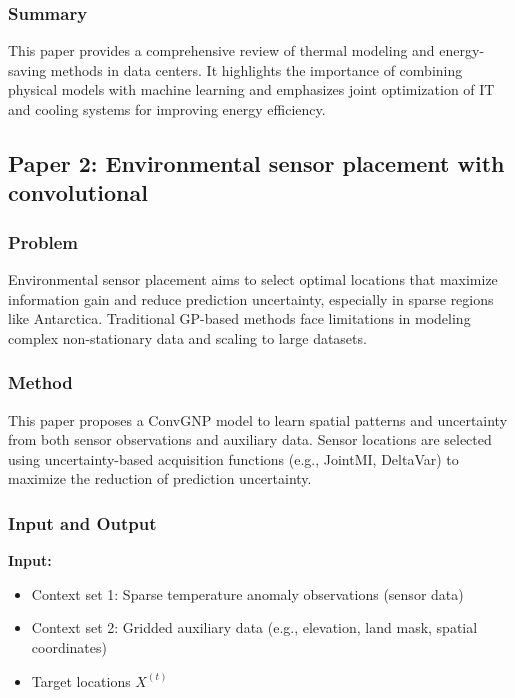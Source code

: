 \documentclass[12pt,a4paper]{article}
\begin{document}
        \subsubsection{Summary}

                This paper provides a comprehensive review of thermal modeling and energy-saving methods in data centers. It highlights the importance of combining physical models with machine learning and emphasizes joint optimization of IT and cooling systems for improving energy efficiency.
\newpage

\subsection{Paper 2: Environmental sensor placement with convolutional }

    \subsubsection{ Problem}
    Environmental sensor placement aims to select optimal locations that maximize information gain and reduce prediction uncertainty, especially in sparse regions like Antarctica. Traditional GP-based methods face limitations in modeling complex non-stationary data and scaling to large datasets.


    \subsubsection{Method}

    This paper proposes a ConvGNP model to learn spatial patterns and uncertainty from both sensor observations and auxiliary data. Sensor locations are selected using uncertainty-based acquisition functions (e.g., JointMI, DeltaVar) to maximize the reduction of prediction uncertainty.

    \subsubsection{ Input and Output}

                \textbf{Input:}
                \begin{itemize}
                    \item Context set 1: Sparse temperature anomaly observations (sensor data)
                    \item Context set 2: Gridded auxiliary data (e.g., elevation, land mask, spatial coordinates)
                    \item Target locations $X^{(t)}$
                \end{itemize}
            
\end{document}
